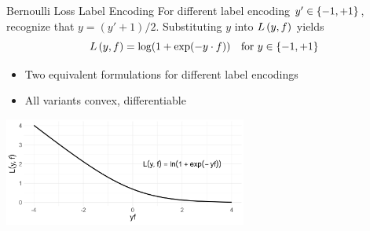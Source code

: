 \documentclass[11pt,compress,t,notes=noshow, xcolor=table]{beamer}
\begin{document}
\begin{vbframe}{Bernoulli Loss Label Encoding}
For different label encoding $y' \in \{-1, +1\}$, recognize that $y=(y'+1)/2$. Substituting $y$ into $L\left(y, f\right)$ yields
\begin{equation*}
  L\left(y, f\right) = \log(1+\exp(-y \cdot f)) \quad \text{for } y \in \{-1, +1\}
\end{equation*}


\begin{itemize}
  \item Two equivalent formulations for different label encodings
  \item All variants convex, differentiable
\end{itemize}

\vspace{0.2cm}
\begin{center}
\includegraphics[width = 8cm]{figure/bernoulli_margin.png}
\end{center}

\end{vbframe}
\end{document}
